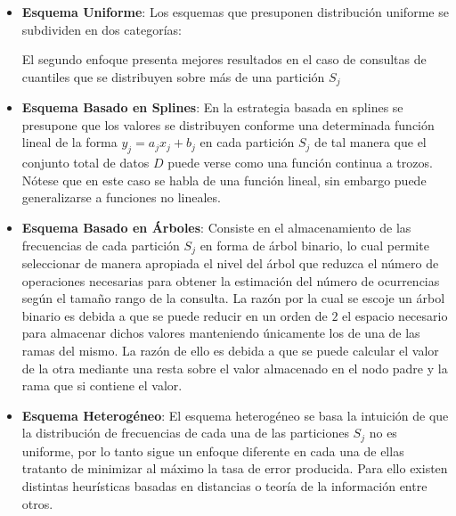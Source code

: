 \documentclass{subfiles}
\begin{document}
        \begin{itemize}

          \item \textbf{Esquema Uniforme}: Los esquemas que presuponen distribución uniforme se subdividen en dos categorías:  El segundo enfoque presenta mejores resultados en el caso de consultas de cuantiles que se distribuyen sobre más de una partición $S_j$

          \item \textbf{Esquema Basado en Splines}: En la estrategia basada en splines se presupone que los valores se distribuyen conforme una determinada función lineal de la forma $y_j = a_jx_j + b_j$ en cada partición $S_j$ de tal manera que el conjunto total de datos $D$ puede verse como una función continua a trozos. Nótese que en este caso se habla de una función lineal, sin embargo puede generalizarse a funciones no lineales.

          \item \textbf{Esquema Basado en Árboles}: Consiste en el almacenamiento de las frecuencias de cada partición $S_j$ en forma de árbol binario, lo cual permite seleccionar de manera apropiada el nivel del árbol que reduzca el número de operaciones necesarias para obtener la estimación del número de ocurrencias según el tamaño rango de la consulta. La razón por la cual se escoje un árbol binario es debida a que se puede reducir en un orden de $2$ el espacio necesario para almacenar dichos valores manteniendo únicamente los de una de las ramas del mismo. La razón de ello es debida a que se puede calcular el valor de la otra mediante una resta sobre el valor almacenado en el nodo padre y la rama que si contiene el valor.

          \item \textbf{Esquema Heterogéneo}: El esquema heterogéneo se basa la intuición de que la distribución de frecuencias de cada una de las particiones $S_j$ no es uniforme, por lo tanto sigue un enfoque diferente en cada una de ellas tratanto de minimizar al máximo la tasa de error producida. Para ello existen  distintas heurísticas basadas en distancias o teoría de la información entre otros.

        \end{itemize}
\end{document}
